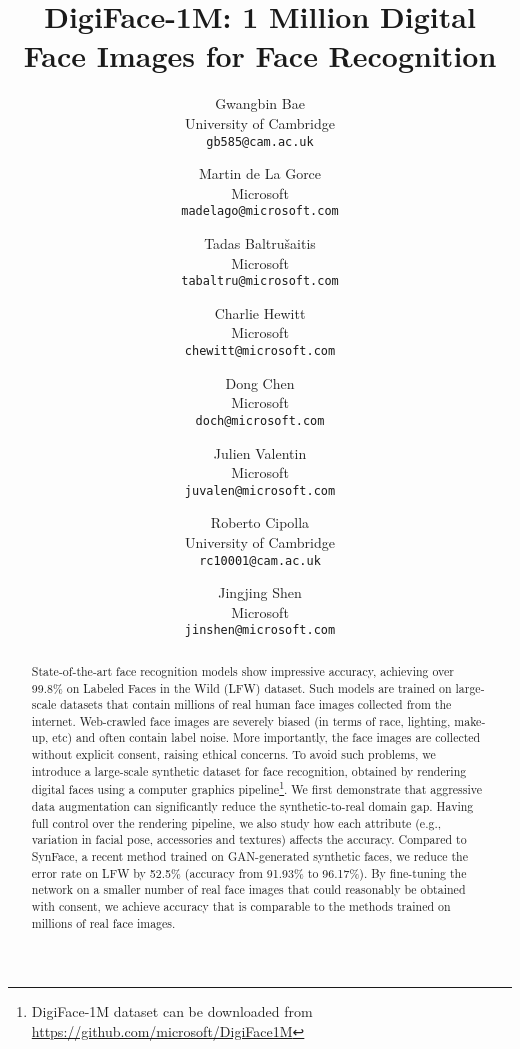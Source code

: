 \documentclass[10pt,twocolumn,letterpaper]{article}
\begin{document}
\title{DigiFace-1M: 1 Million Digital Face Images for Face Recognition}

\author{Gwangbin Bae\\
University of Cambridge\\
{\tt\small gb585@cam.ac.uk}
\and
Martin de La Gorce\\
Microsoft\\
{\tt\small madelago@microsoft.com}
\and
Tadas Baltru\v{s}aitis\\
Microsoft\\
{\tt\small tabaltru@microsoft.com}
\and
Charlie Hewitt\\
Microsoft\\
{\tt\small chewitt@microsoft.com}
\and
Dong Chen\\
Microsoft\\
{\tt\small doch@microsoft.com}
\and
Julien Valentin\\
Microsoft\\
{\tt\small juvalen@microsoft.com}
\and
Roberto Cipolla\\
University of Cambridge\\
{\tt\small rc10001@cam.ac.uk}
\and
Jingjing Shen\\
Microsoft\\
{\tt\small jinshen@microsoft.com}
}

\maketitle
\thispagestyle{empty}

\begin{abstract}
State-of-the-art face recognition models show impressive accuracy, achieving over 99.8\% on Labeled Faces in the Wild (LFW) dataset. Such models are trained on large-scale datasets that contain millions of real human face images collected from the internet. Web-crawled face images are severely biased (in terms of race, lighting, make-up, etc) and often contain label noise. More importantly, the face images are collected without explicit consent, raising ethical concerns. To avoid such problems, we introduce a large-scale synthetic dataset for face recognition, obtained by rendering digital faces using a computer graphics pipeline\footnote{DigiFace-1M dataset can be downloaded from \url{https://github.com/microsoft/DigiFace1M}}. We first demonstrate that aggressive data augmentation can significantly reduce the synthetic-to-real domain gap. Having full control over the rendering pipeline, we also study how each attribute (e.g., variation in facial pose, accessories and textures) affects the accuracy. Compared to SynFace, a recent method trained on GAN-generated synthetic faces, we reduce the error rate on LFW by 52.5\% (accuracy from 91.93\% to 96.17\%). By fine-tuning the network on a smaller number of real face images that could reasonably be obtained with consent, we achieve accuracy that is comparable to the methods trained on millions of real face images.
\end{abstract}
\end{document}
